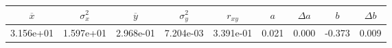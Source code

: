 \begin{tabular}{ccccccccc}
\toprule
$\overline{x}$ & $\sigma_x^2$ & $\overline{y}$ & $\sigma_y^2$ & $r_{xy}$ & $a$ & $\Delta a$ & $b$ & $\Delta b$ \\
\midrule
3.156e+01 & 1.597e+01 & 2.968e-01 & 7.204e-03 & 3.391e-01 & 0.021 & 0.000 & -0.373 & 0.009 \\
\bottomrule
\end{tabular}
